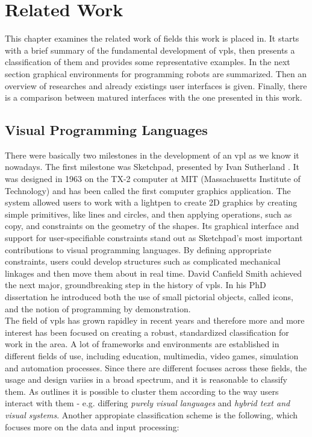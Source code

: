 \chapter{Related Work}
This chapter examines the related work of fields this work is placed in. It starts with a brief summary of the fundamental development of \glspl{vpl}, then presents a classification of them and provides some representative examples. In the next section graphical environments for programming robots are summarized. Then an overview of researches and already existings user interfaces is given. Finally, there is a comparison between matured interfaces with the one presented in this work.

\section{Visual Programming Languages}
There were basically two milestones in the development of an \gls{vpl} as we know it nowadays. The first milestone was Sketchpad, presented by Ivan Sutherland \cite{Sutherland:1963}. It was designed in 1963 on the TX-2 computer at MIT (Massachusetts Institute of Technology) and has been called the first computer graphics application. The system allowed users to work with a lightpen to create 2D graphics by creating simple primitives, like lines and circles, and then applying operations, such as copy, and constraints on the geometry of the shapes. Its graphical interface and support for user-specifiable constraints stand out as Sketchpad's most important contributions to visual programming languages. By defining appropriate constraints, users could develop structures such as complicated mechanical linkages and then move them about in real time.\cite{Boshernitsan:CSD-04-1368} David Canfield Smith achieved the next major, groundbreaking step in the history of \glspl{vpl}. In his PhD dissertation \cite{Smith:1975:PCP:907074} he introduced both the use of small pictorial objects, called icons, and the notion of programming by demonstration. \\

The field of \glspl{vpl} has grown rapidley in recent years and therefore more and more interest has been focused on creating a robust, standardized classification for work in the area. A lot of frameworks and environments are established in different fields of use, including education, multimedia, video games, simulation and automation processes. Since there are different focuses across these fields, the usage and design variies in a broad spectrum, and it is reasonable to classify them. As \cite{Boshernitsan:CSD-04-1368} outlines it is possible to cluster them according to the way users interact with them - e.g. differing \textit{purely visual languages} and \textit{hybrid text and visual systems}. Another appropiate classification scheme is the following, which focuses more on the data and input processing:

